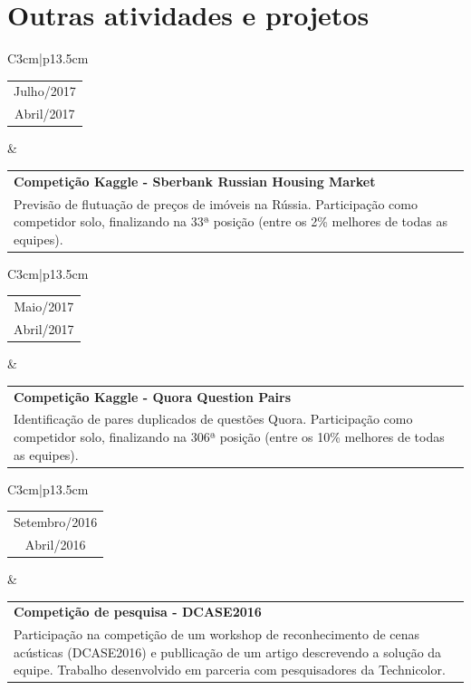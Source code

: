 \section{Outras atividades e projetos}

\begin{tabular}{C{3cm}|p{13.5cm}}
    \begin{tabular}{c}
        Julho/2017
        \\
        Abril/2017
    \end{tabular}
    &
    \setlength\extrarowheight{3pt}
    \begin{tabular}{p{13.5cm}}
        \textbf{Competição Kaggle - Sberbank Russian Housing Market}
        \\
        Previsão de flutuação de preços de imóveis na Rússia. Participação como competidor solo, finalizando na 33ª posição (entre os 2\% melhores de todas as equipes).
    \end{tabular}
\end{tabular}


\begin{tabular}{C{3cm}|p{13.5cm}}
    \begin{tabular}{c}
        Maio/2017
        \\
        Abril/2017
    \end{tabular}
    &
    \setlength\extrarowheight{3pt}
    \begin{tabular}{p{13.5cm}}
        \textbf{Competição Kaggle - Quora Question Pairs}
        \\
        Identificação de pares duplicados de questões Quora. Participação como competidor solo, finalizando na 306ª posição (entre os 10\% melhores de todas as equipes).
    \end{tabular}
\end{tabular}


\begin{tabular}{C{3cm}|p{13.5cm}}
    \begin{tabular}{c}
        Setembro/2016
        \\
        Abril/2016
    \end{tabular}
    &
    \setlength\extrarowheight{3pt}
    \begin{tabular}{p{13.5cm}}
        \textbf{Competição de pesquisa - DCASE2016}
        \\
        Participação na competição de um workshop de reconhecimento de cenas acústicas (DCASE2016) e publlicação de um artigo descrevendo a solução da equipe. Trabalho desenvolvido em parceria com pesquisadores da Technicolor.
    \end{tabular}
\end{tabular}



